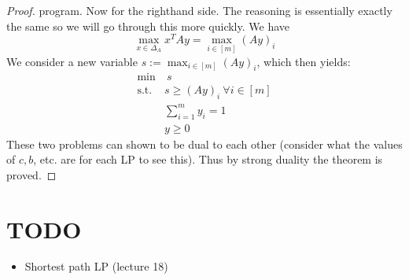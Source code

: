 \documentclass[12pt]{article}
\begin{document}
\begin{proof}
program. Now for the righthand side. The reasoning is essentially exactly the same so we will go through this more quickly. We have 
\[ \max_{x \in \Delta_A} x^T A y = \max_{i \in [m]} (Ay)_i\]
We consider a new variable $s := \max_{i \in [m]} (Ay)_i$, which then yields: 
\begin{align*}
\min & \ s \\
\text{s.t. } &s \geq (Ay)_i \ \forall i \in [m]  \\
&\sum_{i = 1}^{m} y_i = 1 \\
&y \geq 0
\end{align*}
These two problems can shown to be dual to each other (consider what the values of $c, b$, etc. are for each LP to see this). Thus by strong duality the theorem is proved. 
\end{proof}


	
\section{TODO}
\begin{itemize}
\item Shortest path LP (lecture 18)
\end{itemize}
	
	
\end{document}
